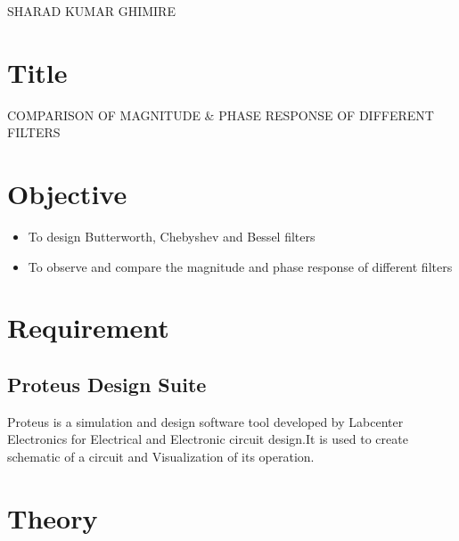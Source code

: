 \documentclass[a4paper,11pt]{article}
\begin{document}
{SHARAD KUMAR GHIMIRE}

\renewcommand{\contentsname}{Table of Contents}
\tableofcontents

\vspace{5em}
\pagebreak
\listoffigures
\pagebreak
{}

\section{Title} {\large COMPARISON OF MAGNITUDE \& PHASE RESPONSE OF
  DIFFERENT FILTERS}


\section{Objective}
\begin{itemize}
    \item To design Butterworth, Chebyshev and Bessel filters
    \item To observe and compare the magnitude and phase response of different filters
\end{itemize}

\section{Requirement}

\subsection{Proteus Design Suite}

Proteus is a simulation and design software tool developed by Labcenter Electronics for Electrical
and Electronic circuit design.It is used to create schematic  of a circuit and
Visualization of its operation.




\section{Theory}

\end{document}

